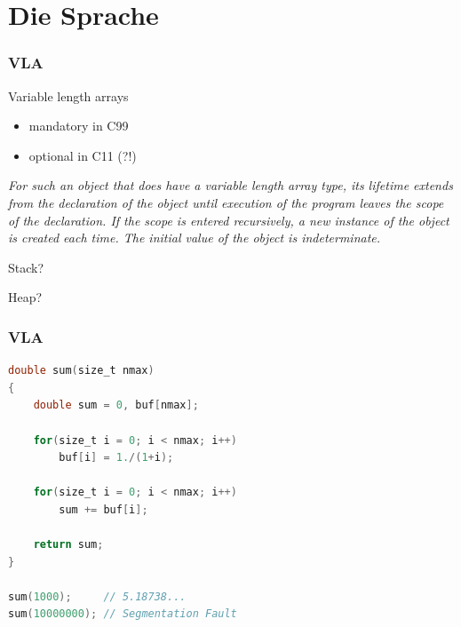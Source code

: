 \documentclass[12pt,compress]{beamer}
\begin{document}

\section{Die Sprache}


\begin{frame}
    \frametitle{VLA}

    Variable length arrays
    \begin{itemize}
    \item mandatory in C99
    \item optional in C11 (?!)
    \end{itemize}

    \vfill

    {{\it For such an object that does have a variable length array type, its
    lifetime extends from the declaration of the object until execution of the
    program leaves the scope of the declaration. If the scope is entered
    recursively, a new instance of the object is created each time. The initial
    value of the object is indeterminate.}} 

    \vfill

    {
    Stack?

    Heap?
    }

\end{frame}

\begin{frame}[fragile]
    \frametitle{VLA}

\begin{lstlisting}[language=C,basicstyle=\ttfamily,keywordstyle=\color{red}]
double sum(size_t nmax)
{
    double sum = 0, buf[nmax];

    for(size_t i = 0; i < nmax; i++)
        buf[i] = 1./(1+i);

    for(size_t i = 0; i < nmax; i++)
        sum += buf[i];

    return sum;
}

sum(1000);     // 5.18738...
sum(10000000); // Segmentation Fault
\end{lstlisting}
\end{frame}
\end{document}
